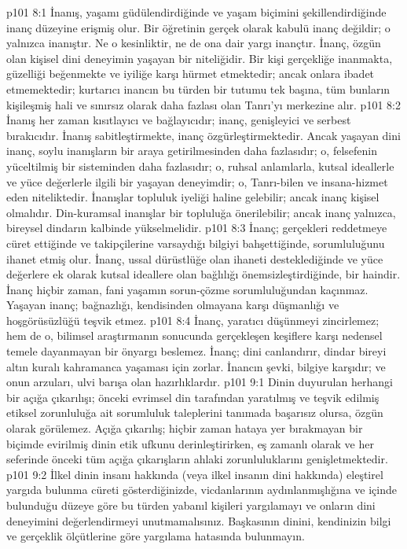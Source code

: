 \vs p101 8:1 İnanış, yaşamı güdülendirdiğinde ve yaşam biçimini şekillendirdiğinde inanç düzeyine erişmiş olur. Bir öğretinin gerçek olarak kabulü inanç değildir; o yalnızca inanıştır. Ne o kesinliktir, ne de ona dair yargı inançtır. İnanç, özgün olan kişisel dini deneyimin yaşayan bir niteliğidir. Bir kişi gerçekliğe inanmakta, güzelliği beğenmekte ve iyiliğe karşı hürmet etmektedir; ancak onlara ibadet etmemektedir; kurtarıcı inancın bu türden bir tutumu tek başına, tüm bunların kişileşmiş hali ve sınırsız olarak daha fazlası olan Tanrı’yı merkezine alır.
\vs p101 8:2 İnanış her zaman kısıtlayıcı ve bağlayıcıdır; inanç, genişleyici ve serbest bırakıcıdır. İnanış sabitleştirmekte, inanç özgürleştirmektedir. Ancak yaşayan dini inanç, soylu inanışların bir araya getirilmesinden daha fazlasıdır; o, felsefenin yüceltilmiş bir sisteminden daha fazlasıdır; o, ruhsal anlamlarla, kutsal ideallerle ve yüce değerlerle ilgili bir yaşayan deneyimdir; o, Tanrı\hyp{}bilen ve insana\hyp{}hizmet eden niteliktedir. İnanışlar topluluk iyeliği haline gelebilir; ancak inanç kişisel olmalıdır. Din\hyp{}kuramsal inanışlar bir topluluğa önerilebilir; ancak inanç yalnızca, bireysel dindarın kalbinde yükselmelidir.
\vs p101 8:3 İnanç; gerçekleri reddetmeye cüret ettiğinde ve takipçilerine varsaydığı bilgiyi bahşettiğinde, sorumluluğunu ihanet etmiş olur. İnanç, ussal dürüstlüğe olan ihaneti desteklediğinde ve yüce değerlere ek olarak kutsal ideallere olan bağlılığı önemsizleştirdiğinde, bir haindir. İnanç hiçbir zaman, fani yaşamın sorun\hyp{}çözme sorumluluğundan kaçınmaz. Yaşayan inanç; bağnazlığı, kendisinden olmayana karşı düşmanlığı ve hoşgörüsüzlüğü teşvik etmez.
\vs p101 8:4 İnanç, yaratıcı düşünmeyi zincirlemez; hem de o, bilimsel araştırmanın sonucunda gerçekleşen keşiflere karşı nedensel temele dayanmayan bir önyargı beslemez. İnanç; dini canlandırır, dindar bireyi altın kuralı kahramanca yaşaması için zorlar. İnancın şevki, bilgiye karşıdır; ve onun arzuları, ulvi barışa olan hazırlıklardır.
\vs p101 9:1 Dinin duyurulan herhangi bir açığa çıkarılışı; önceki evrimsel din tarafından yaratılmış ve teşvik edilmiş etiksel zorunluluğa ait sorumluluk taleplerini tanımada başarısız olursa, özgün olarak görülemez. Açığa çıkarılış; hiçbir zaman hataya yer bırakmayan bir biçimde evirilmiş dinin etik ufkunu derinleştirirken, eş zamanlı olarak ve her seferinde önceki tüm açığa çıkarışların ahlaki zorunluluklarını genişletmektedir.
\vs p101 9:2 İlkel dinin insanı hakkında (veya ilkel insanın dini hakkında) eleştirel yargıda bulunma cüreti gösterdiğinizde, vicdanlarının aydınlanmışlığına ve içinde bulunduğu düzeye göre bu türden yabanıl kişileri yargılamayı ve onların dini deneyimini değerlendirmeyi unutmamalısınız. Başkasının dinini, kendinizin bilgi ve gerçeklik ölçütlerine göre yargılama hatasında bulunmayın.
